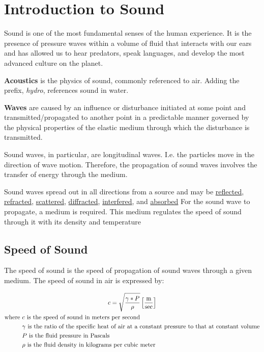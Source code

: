 %

\chapter{Introduction to Sound}
\setchapterpreamble[u]{\margintoc}

Sound is one of the most fundamental senses of the human experience.
It is the presence of pressure waves within a volume of fluid that interacts with our ears and has allowed us to hear predators, speak languages, and develop the most advanced culture on the planet.

\textbf{Acoustics} is the physics of sound, commonly referenced to air. Adding the prefix, \textit{hydro}, references sound in water.

\textbf{Waves} are caused by an influence or disturbance initiated at some point and transmitted/propagated to another point in a predictable manner governed by the physical properties of the elastic medium through which the disturbance is transmitted.

Sound waves, in particular, are longitudinal waves. I.e. the particles move in the direction of wave motion.
Therefore, the propagation of sound waves involves the transfer of energy through the medium.

Sound waves spread out in all directions from a source and may be \underline{reflected}, \underline{refracted}, \underline{scattered}, \underline{diffracted}, \underline{interfered}, and \underline{absorbed} 
For the sound wave to propagate, a medium is required. 
This medium regulates the speed of sound through it with its density and temperature

\section{Speed of Sound}
The speed of sound is the speed of propagation of sound waves through a given medium.
The speed of sound in air is expressed by:

\begin{gather} \labeq{speed_of_sound_air}
    c = \sqrt{\frac{\gamma*P}{\rho}} \left[\frac{\text{m}}{\text{sec}}\right] \\    
    \begin{aligned}
        \text{where }   &c \text{ is the speed of sound in meters per second} \\
                        &\gamma \text{ is the ratio of the specific heat of air at a constant pressure to that at constant volume} \\
                        &P \text{ is the fluid pressure in Pascals} \\
                        &\rho \text{ is the fluid density in kilograms per cubic meter} \\
    \end{aligned} \notag
\end{gather}

